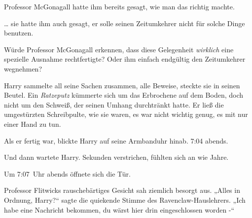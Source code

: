 Professor McGonagall hatte ihm bereits gesagt, wie man das richtig machte.

… sie hatte ihm auch gesagt, er solle seinen Zeitumkehrer nicht für solche Dinge benutzen.

Würde Professor McGonagall erkennen, dass diese Gelegenheit \emph{wirklich} eine spezielle Ausnahme rechtfertigte? Oder ihm einfach endgültig den Zeitumkehrer wegnehmen?

Harry sammelte all seine Sachen zusammen, alle Beweise, steckte sie in seinen Beutel. Ein \emph{Ratzeputz} kümmerte sich um das Erbrochene auf dem Boden, doch nicht um den Schweiß, der seinen Umhang durchtränkt hatte. Er ließ die umgestürzten Schreibpulte, wie sie waren, es war nicht wichtig genug, es mit nur einer Hand zu tun.

Als er fertig war, blickte Harry auf seine Armbanduhr hinab. 7:04 abends.

Und dann wartete Harry. Sekunden verstrichen, fühlten sich an wie Jahre.

Um 7:07~Uhr abends öffnete sich die Tür.

Professor Flitwicks rauschebärtiges Gesicht sah ziemlich besorgt aus. „Alles in Ordnung, Harry?“ sagte die quiekende Stimme des Ravenclaw-Hauslehrers. „Ich habe eine Nachricht bekommen, du wärst hier drin eingeschlossen worden -“

